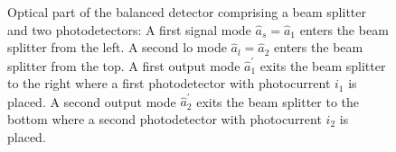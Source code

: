 
\begin{figure}[htb]
    \centering
    
    \caption{Optical part of the balanced detector comprising a beam splitter and two photodetectors: A first signal mode $\hat{a}_s=\hat{a}_1$ enters the beam splitter from the left. A second \gls{lo} mode $\hat{a}_l=\hat{a}_2$ enters the beam splitter from the top. A first output mode $\hat{a}_1^\prime$ exits the beam splitter to the right where a first photodetector with photocurrent $i_1$ is placed. A second output mode $\hat{a}_2^\prime$ exits the beam splitter to the bottom where a second photodetector with photocurrent $i_2$ is placed.}\label{fig:balanced_detector_optics}
\end{figure}

